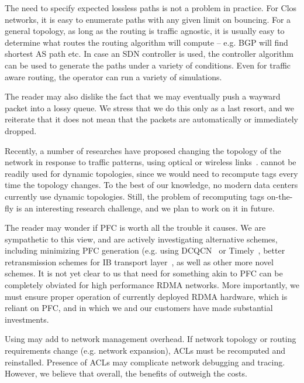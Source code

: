  The need to specify expected
lossless paths is not a problem in practice. For Clos networks, it is easy to
enumerate paths with any given limit on bouncing. For a general topology, as long
as the routing is traffic agnostic, it is usually easy to determine what routes
the routing algorithm will compute -- e.g. BGP will find shortest AS path etc.
In case an SDN controller is used, the controller algorithm can be used to
generate the paths under a variety of conditions. Even for traffic aware
routing, the operator can run a variety of simulations.

The reader may also dislike the fact that we may eventually push a wayward
packet into a lossy queue. We stress that we do this only as a last resort, and
we reiterate that it does not mean that the packets are automatically or
immediately dropped.

 Recently, a number of researches have proposed
changing the topology of the network in response to traffic patterns, using
optical or wireless links~\cite{helios,flyways,projector,mirrormirror}.
\sysname{} cannot be readily used for dynamic topologies, since we would need to
recompute tags every time the topology changes. To the best of our knowledge, no
modern data centers currently use dynamic topologies. Still, the problem of
recomputing tags on-the-fly is an interesting research challenge, and we plan to
work on it in future.

 The reader may wonder if PFC is worth all the trouble
it causes. We are sympathetic to this view, and are actively investigating
alternative schemes, including minimizing PFC generation (e.g.  using
DCQCN~\cite{dcqcn} or Timely~\cite{timely}, better retransmission schemes for IB
transport layer~\cite{xxx}, as well as other more novel schemes.  It is not yet
clear to us that need for something akin to PFC can be completely obviated for
high performance RDMA networks. More importantly, we must ensure proper
operation of currently deployed RDMA hardware, which is reliant on PFC, and in
which we and our customers have made substantial investments.

 Using \sysname{} may add to network management
overhead. If network topology or routing requirements change (e.g. network
expansion), ACLs must be recomputed and reinstalled. Presence of ACLs may
complicate network debugging and tracing. However, we believe that overall, the
benefits of \sysname{} outweigh the costs.
